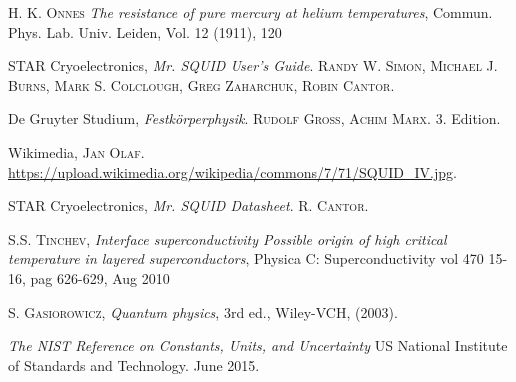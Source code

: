 \documentclass[a4paper,10pt]{article}
\begin{document}
\begin{thebibliography}{99}
 \textsc{H. K. Onnes} \textit{The resistance of pure mercury at helium temperatures}, Commun. Phys. Lab. Univ. Leiden, Vol. 12 (1911), 120 

STAR Cryoelectronics, \textit{Mr. SQUID User's  Guide}. \textsc{Randy W. Simon, Michael J. Burns, Mark S. Colclough, Greg Zaharchuk, Robin Cantor}. 

De Gruyter Studium, \textit{Festkörperphysik}. \textsc{Rudolf Gross, Achim Marx}. 3. Edition.

Wikimedia, \textsc{Jan Olaf}. \url{https://upload.wikimedia.org/wikipedia/commons/7/71/SQUID_IV.jpg}.

STAR Cryoelectronics, \textit{Mr. SQUID Datasheet}. \textsc{R. Cantor}. 

  \textsc{S.S. Tinchev}, \textit{Interface superconductivity {\textendash} Possible origin of high critical temperature in layered superconductors}, Physica C: Superconductivity vol 470 15-16, pag 626-629, Aug 2010

\textsc{S. Gasiorowicz}, \textit{Quantum physics}, 3rd ed., Wiley-VCH, (2003).

\textit{The NIST Reference on Constants, Units, and Uncertainty} US National Institute of Standards and Technology. June 2015. 

\end{thebibliography}
\end{document}
